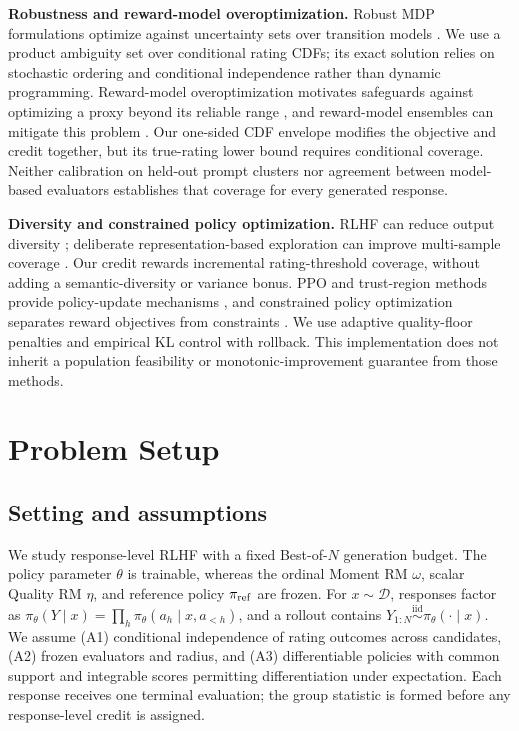 \documentclass{article}
\theoremstyle{definition}
\theoremstyle{remark}
\begin{document}
\textbf{Robustness and reward-model overoptimization.}
Robust MDP formulations optimize against uncertainty sets over transition
models \citep{iyengar2005robust,nilim2005robust}. We use a product ambiguity
set over conditional rating CDFs; its exact solution relies on stochastic
ordering and conditional independence rather than dynamic programming.
Reward-model overoptimization motivates safeguards against optimizing a proxy
beyond its reliable range \citep{gao2023scaling}, and reward-model ensembles
can mitigate this problem \citep{coste2024reward}. Our one-sided CDF envelope
modifies the objective and credit together, but its true-rating lower bound
requires conditional coverage. Neither calibration on held-out prompt
clusters nor agreement between model-based evaluators establishes that
coverage for every generated response.

\textbf{Diversity and constrained policy optimization.}
RLHF can reduce output diversity \citep{kirk2024understanding}; deliberate
representation-based exploration can improve multi-sample coverage
\citep{tuyls2026representation}. Our credit rewards incremental rating-threshold
coverage, without adding a semantic-diversity or variance bonus.
PPO and trust-region methods provide policy-update mechanisms
\citep{schulman2017proximal,schulman2015trust}, and constrained policy
optimization separates reward objectives from constraints
\citep{achiam2017constrained}. We use adaptive quality-floor penalties and
empirical KL control with rollback. This implementation does not inherit a
population feasibility or monotonic-improvement guarantee from those methods.

\section{Problem Setup}
\label{sec:problem-setup}

\subsection{Setting and assumptions}
We study response-level RLHF with a fixed Best-of-\(N\) generation budget.  The
policy parameter \(\theta\) is trainable, whereas the ordinal Moment RM \(\omega\),
scalar Quality RM \(\eta\), and reference policy \(\pi_{\rm ref}\) are frozen.
For \(x\sim\mathcal D\), responses factor as
\(\pi_\theta(Y\mid x)=\prod_h\pi_\theta(a_h\mid x,a_{<h})\), and a rollout
contains \(Y_{1:N}\overset{\mathrm{iid}}{\sim}\pi_\theta(\cdot\mid x)\).  We
assume (A1) conditional independence of rating outcomes across candidates, (A2)
frozen evaluators and radius, and (A3) differentiable policies with common
support and integrable scores permitting differentiation under expectation. Each response
receives one terminal evaluation; the group statistic is formed before any
response-level credit is assigned.
\end{document}
